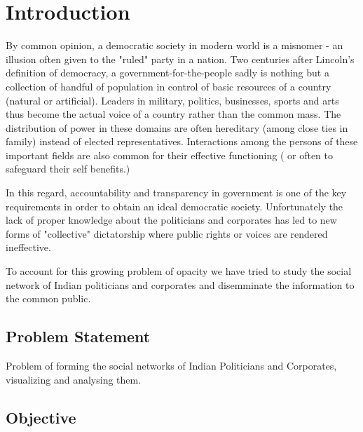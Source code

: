 \chapter{Introduction}


By common opinion, a democratic society in modern world is a misnomer - an illusion often given to the "ruled" party in a nation. Two centuries after Lincoln's definition of democracy, a government-for-the-people sadly is nothing but a collection of handful of population in control of basic resources of a country (natural or artificial). Leaders in military, politics, businesses, sports and arts thus become the actual voice of a country rather than the common mass. The distribution of power in these domains are often hereditary (among close ties in family) instead of elected representatives. Interactions among the persons of these important fields are also common for their effective functioning ( or often to safeguard their self benefits.)

In this regard, accountability and transparency in government is one of the key requirements in order to obtain an ideal democratic society. Unfortunately the lack of proper knowledge about the politicians and corporates has led to new forms of "collective" dictatorship where public rights or voices are rendered ineffective.

To account for this growing problem of opacity we have tried to study the social network of Indian politicians and corporates and disemminate the information to the common public.

\section{Problem Statement}
Problem of forming the social networks of Indian Politicians and Corporates, visualizing  and analysing them.

\section{Objective}

